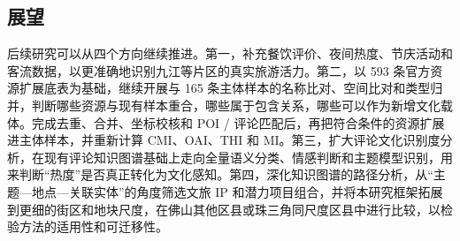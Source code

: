 \subsection{展望}\label{ux5c55ux671b}

后续研究可以从四个方向继续推进。第一，补充餐饮评价、夜间热度、节庆活动和客流数据，以更准确地识别九江等片区的真实旅游活力。第二，以 593 条官方资源扩展底表为基础，继续开展与 165 条主体样本的名称比对、空间比对和类型归并，判断哪些资源与现有样本重合，哪些属于包含关系，哪些可以作为新增文化载体。完成去重、合并、坐标校核和 POI / 评论匹配后，再把符合条件的资源扩展进主体样本，并重新计算 CMI、OAI、THI 和 MI。第三，扩大评论文化识别度分析，在现有评论知识图谱基础上走向全量语义分类、情感判断和主题模型识别，用来判断``热度''是否真正转化为文化感知。第四，深化知识图谱的路径分析，从``主题---地点---关联实体''的角度筛选文旅 IP 和潜力项目组合，并将本研究框架拓展到更细的街区和地块尺度，在佛山其他区县或珠三角同尺度区县中进行比较，以检验方法的适用性和可迁移性。
